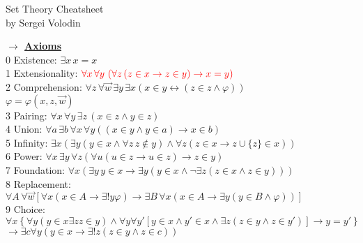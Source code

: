 \documentclass[9pt]{article}
\newcommand{\mytitle}[1]{ {\bf $\rightarrow$ \underline{#1}}\\}
\begin{document}
\begin{center}
	{\large Set Theory Cheatsheet}\\
	by Sergei Volodin
\end{center}
\mytitle{Axioms}
0 Existence: $\exists x\, x=x$\\
1 Extensionality: $\color{red}\forall x\,\forall y\,\left(\forall z \left(z\in x\to z\in y\right)\to x=y \right)$\\
2 Comprehension: $\forall z\,\forall \vec{w}\,\exists y\,\exists x\left(x\in y\leftrightarrow \left(z\in z \wedge\varphi\right)\right)$\\
$\varphi=\varphi(x,z,\vec{w})$\\
3 Pairing: $\forall x\,\forall y\,\exists z\,\left(x\in z\wedge y\in z\right)$\\
4 Union: $\forall a\,\exists b\,\forall x\,\forall y\left((x\in y\wedge y\in a)\to x\in b\right)$\\
5 Infinity: $\exists x\left(\exists y(y\in x\wedge\forall z\,z\notin y)\wedge \forall z(z\in x\to z\cup \{z\}\in x)\right)$\\
6 Power: $\forall x\,\exists y\,\forall z\left(\forall u(u\in z\to u\in z)\to z\in y\right)$\\
7 Foundation: $\forall x\left(\exists y\,y\in x\to\exists y(y\in x\wedge \neg \exists z(z\in x\wedge z\in y))\right)$\\
8 Replacement: $\forall A\,\forall\vec{w}\left[\forall x(x\in A\to\exists !y\varphi)\to\exists B\,\forall x(x\in A\to \exists y(y\in B\wedge \varphi))\right]$\\
9 Choice: $\forall x \left\{\forall y(y\in x\exists z z\in y)\wedge \forall y\forall y'\left[y\in x\wedge y'\in x\wedge \exists z (z\in y\wedge z\in y')\right]\to y=y'\right\}$ $\to\exists c\forall y(y\in x\to\exists !z(z\in y\wedge z\in c))$
\end{document}
